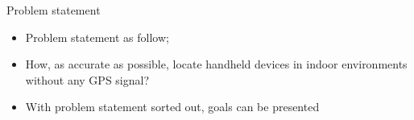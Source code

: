 \begin{block}{Problem statement}
	\begin{itemize}
		\item Problem statement as follow;
		\item How, as accurate as possible, locate handheld devices in indoor environments without any GPS signal?	
		\item With problem statement sorted out, goals can be presented
	\end{itemize}
\end{block}
